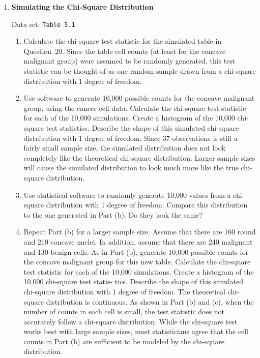 \documentclass[
]{report}
\begin{document}
\begin{enumerate}
\begin{enumerate}
  $\bullet$ Calculate the chi-square statistic. If the observed frequencies are very different from the expected frequencies, the test       statistic will be large and we can reject the theoretical model.
  
  Note that we can never prove that the population actually follows a normal (or any other theoretical)
  model. We can only prove that a proposed model is wrong or fail to reject the model. Care should be
  taken not to state that we have proven that any population actually follows a particular distribution.

  \end{enumerate}

  \item \textbf{Simulating the Chi-Square Distribution}    

  Data set: \texttt{Table 5.1}    
  
  \begin{enumerate}
    \item Calculate the chi-square test statistic for the simulated table in Question 20. Since the table cell counts (at least for the concave malignant group) were assumed to be randomly generated, this test statistic can be thought of as one random sample drawn from a chi-square distribution with 1 degree of freedom.
    \item Use software to generate 10,000 possible counts for the concave malignant group, using the cancer cell data. Calculate the chi-square test statistic for each of the 10,000 simulations. Create a histogram of the 10,000 chi-square test statistics. Describe the shape of this simulated chi-square distribution with 1 degree of freedom. Since 37 observations is still a fairly small sample size, the simulated distribution does not look completely like the theoretical chi-square distribution. Larger sample sizes will cause the simulated distribution to look much more like the true chi-square distribution.
    \item Use statistical software to randomly generate 10,000 values from a chi-square distribution with 1 degree of freedom. Compare this distribution to the one generated in Part (b). Do they look the same?
    \item Repeat Part (b) for a larger sample size. Assume that there are 160 round and 210 concave nuclei. In
addition, assume that there are 240 malignant and 130 benign cells. As in Part (b), generate 10,000
possible counts for the concave malignant group for this new table. Calculate the chi-square test
statistic for each of the 10,000 simulations. Create a histogram of the 10,000 chi-square test statis-
tics. Describe the shape of this simulated chi-square distribution with 1 degree of freedom.
The theoretical chi-square distribution is continuous. As shown in Part (b) and (c), when the
number of counts in each cell is small, the test statistic does not accurately follow a chi-square
distribution. While the chi-square test works best with large sample sizes, most statisticians agree
that the cell counts in Part (b) are sufficient to be modeled by the chi-square distribution.
  \end{enumerate}
  

\end{enumerate}
\end{document}
